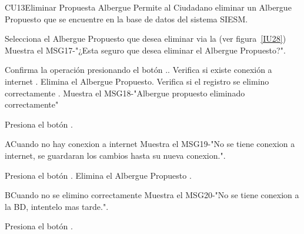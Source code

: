 \begin{UseCase}{CU13}{Eliminar Propuesta Albergue}{
		Permite al Ciudadano eliminar un Albergue Propuesto  que se encuentre en la base de datos del sistema SIESM.\\
}
	
\end{UseCase}


\begin{UCtrayectoria}
	\item\UCactor Selecciona el Albergue Propuesto que desea eliminar via la (ver figura~\ref{IU28}) 
	\UCpaso Muestra el MSG17-"¿Esta seguro que desea eliminar el Albergue Propuesto?".
	\item\UCactor Confirma la operación presionando el botón ..
	\UCpaso Verifica si existe conexión a internet .
	\UCpaso Elimina el Albergue Propuesto.
	\UCpaso Verifica si el registro se elimino correctamente .
	\UCpaso Muestra el MSG18-"Albergue propuesto eliminado correctamente"
	\item\UCactor Presiona el botón .
\end{UCtrayectoria}


\begin{UCtrayectoriaA}{A}{Cuando no hay conexion a internet}
	\UCpaso Muestra el MSG19-"No se tiene conexion a internet, se guardaran los cambios hasta su nueva conexion.".
	\item\UCactor Presiona el botón .
	\UCpaso Elimina el Albergue Propuesto .	
\end{UCtrayectoriaA}

\begin{UCtrayectoriaA}{B}{Cuando no se elimino correctamente}
	\UCpaso Muestra el MSG20-"No se tiene conexion a la BD, intentelo mas tarde.".
	\item\UCactor Presiona el botón .
\end{UCtrayectoriaA}
